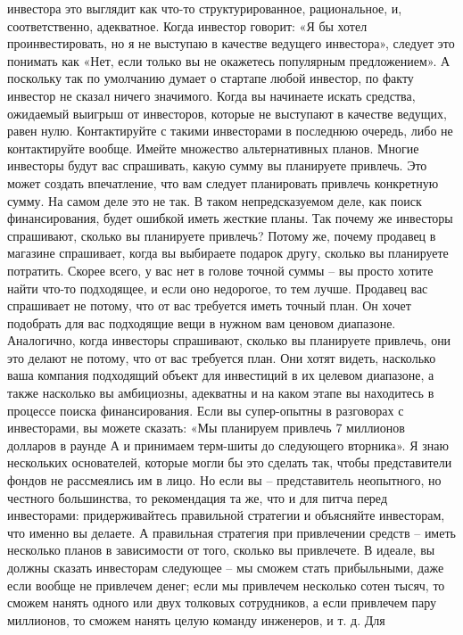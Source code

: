 \documentclass[ebook,12pt,oneside,openany]{memoir}
\begin{document}
инвестора это выглядит как что-то структурированное, рациональное, и,
соответственно, адекватное. Когда инвестор говорит: «Я бы хотел
проинвестировать, но я не выступаю в качестве ведущего инвестора»,
следует это понимать как «Нет, если только вы не окажетесь популярным
предложением». А поскольку так по умолчанию думает о стартапе любой
инвестор, по факту инвестор не сказал ничего значимого. Когда вы
начинаете искать средства, ожидаемый выигрыш от инвесторов, которые не
выступают в качестве ведущих, равен нулю. Контактируйте с такими
инвесторами в последнюю очередь, либо не контактируйте вообще. Имейте
множество альтернативных планов. Многие инвесторы будут вас
спрашивать, какую сумму вы планируете привлечь. Это может создать
впечатление, что вам следует планировать привлечь конкретную сумму. На
самом деле это не так. В таком непредсказуемом деле, как поиск
финансирования, будет ошибкой иметь жесткие планы. Так почему же
инвесторы спрашивают, сколько вы планируете привлечь? Потому же,
почему продавец в магазине спрашивает, когда вы выбираете подарок
другу, сколько вы планируете потратить. Скорее всего, у вас нет в
голове точной суммы – вы просто хотите найти что-то подходящее, и если
оно недорогое, то тем лучше. Продавец вас спрашивает не потому, что от
вас требуется иметь точный план. Он хочет подобрать для вас подходящие
вещи в нужном вам ценовом диапазоне. Аналогично, когда инвесторы
спрашивают, сколько вы планируете привлечь, они это делают не потому,
что от вас требуется план. Они хотят видеть, насколько ваша компания
подходящий объект для инвестиций в их целевом диапазоне, а также
насколько вы амбициозны, адекватны и на каком этапе вы находитесь в
процессе поиска финансирования. Если вы супер-опытны в разговорах с
инвесторами, вы можете сказать: «Мы планируем привлечь 7 миллионов
долларов в раунде А и принимаем терм-шиты до следующего вторника». Я
знаю нескольких основателей, которые могли бы это сделать так, чтобы
представители фондов не рассмеялись им в лицо. Но если вы –
представитель неопытного, но честного большинства, то рекомендация та
же, что и для питча перед инвесторами: придерживайтесь правильной
стратегии и объясняйте инвесторам, что именно вы делаете. А правильная
стратегия при привлечении средств – иметь несколько планов в
зависимости от того, сколько вы привлечете. В идеале, вы должны
сказать инвесторам следующее – мы сможем стать прибыльными, даже если
вообще не привлечем денег; если мы привлечем несколько сотен тысяч, то
сможем нанять одного или двух толковых сотрудников, а если привлечем
пару миллионов, то сможем нанять целую команду инженеров, и т. д. Для
\end{document}
